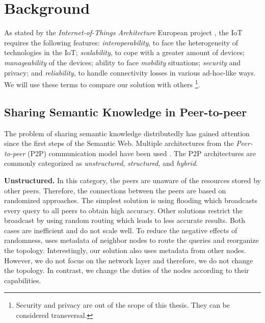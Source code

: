 \section{Background}
\label{background}
As stated by the \emph{Internet-of-Things Architecture} European project \citep{walewski_project_2011}, the IoT requires the following features:
\emph{interoperability}, to face the heterogeneity of technologies in the IoT;
\emph{scalability}, to cope with a greater amount of devices;
\emph{manageability} of the devices;
ability to face \emph{mobility} situations;
\emph{security} and privacy; and
\emph{reliability}, to handle connectivity losses in various ad-hoc-like ways.
We will use these terms to compare our solution with others
\footnote{Security and privacy are out of the scope of this thesis. They can be considered transversal.}.

\subsection{Sharing Semantic Knowledge in Peer-to-peer}
The problem of sharing semantic knowledge distributedly has gained attention since the first steps of the Semantic Web.
Multiple architectures from the \emph{Peer-to-peer} (P2P) communication model have been used \citep{filali2011survey}.
The P2P architectures are commonly categorized as \emph{unstructured}, \emph{structured}, and \emph{hybrid}.

\noindent\textbf{Unstructured.}
In this category, the peers are unaware of the resources stored by other peers.
Therefore, the connections between the peers are based on randomized approaches.
The simplest solution is using flooding \citep{halevy_piazza:_2003,krummenacher_open_2009} which broadcasts every query to all peers to obtain high accuracy.
Other solutions restrict the broadcast by using random routing which leads to less accurate results.
Both cases are inefficient and do not scale well.
To reduce the negative effects of randomness, \citet{zhou_building_2009} uses metadata of neighbor nodes to route the queries and reorganize the topology. %
Interestingly, our solution also uses metadata from other nodes.
However, we do not focus on the network layer and therefore, we do not change the topology.
In contrast, we change the duties of the nodes according to their capabilities.

